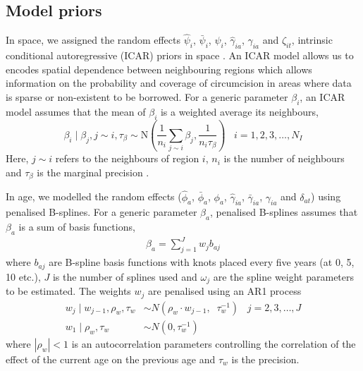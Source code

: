\documentclass{article}
\begin{document}
\begin{appendix}

\subsection{Model priors}


In space, we assigned the random effects $\hat{\psi}_i$, $\bar{\psi}_i$, $\psi_i$, $\hat{\gamma}_{ia}$, $\gamma_{ia}$ and $\zeta_{it}$, intrinsic conditional autoregressive (ICAR) priors in space \cite{besag1995conditional}. An ICAR model allows us to encodes spatial dependence between neighbouring regions which allows information on the probability and coverage of circumcision in areas where data is sparse or non-existent to be borrowed. For a generic parameter $\beta_i$, an ICAR model assumes that the mean of $\beta_i$ is a weighted average its neighbours, 
\begin{equation*}
	\beta_i \;|\; \beta_{j}, j \sim i, \tau_{\beta} \sim \text{N}\left(\frac{1}{n_i} \sum_{j \sim i} \beta_j, \frac{1}{n_i\tau_{\beta}} \right) \;\;\; i = 1, 2, 3,\ldots, N_I
\end{equation*}
Here, $j \sim i$ refers to the neighbours of region $i$, $n_i$ is the number of neighbours and $\tau_{\beta}$ is the marginal precision \cite{rue2005gaussian}. 

In age, we modelled the random effects ($\hat{\phi}_a$, $\bar{\phi}_a$, $\phi_a$, $\hat{\gamma}_{ia}$, $\bar{\gamma}_{ia}$, $\gamma_{ia}$ and $\delta_{at}$) using penalised B-splines. For a generic parameter $\beta_a$, penalised B-splines assumes that $\beta_a$ is a sum of basis functions, 
\begin{align*} 
	\beta_a = \sum_{j = 1}^{J} w_{j}b_{aj}
\end{align*} 
where $b_{aj}$ are B-spline basis functions with knots placed every five years (at 0, 5, 10 etc.), $J$ is the number of splines used and $\omega_{j}$ are the spline weight parameters to be estimated. The weights $w_{j}$ are penalised using an AR1 process 
\begin{align*} 
  w_{j} \; | \; w_{j-1}, \rho_{w}, \tau_{w} &\sim N(\rho_{w} \cdot w_{j-1}, \;\; \tau^{-1}_{w}) \;\;\;  j = 2, 3,\ldots, J \\
  w_{1} \; | \; \rho_{w}, \tau_{w} &\sim N(0, \tau^{-1}_{w}) 
\end{align*}
where $|\rho_{w}| < 1$ is an autocorrelation parameters controlling the correlation of the effect of the current age on the previous age and $\tau_{w}$ is the precision.


\end{appendix}
\end{document}
